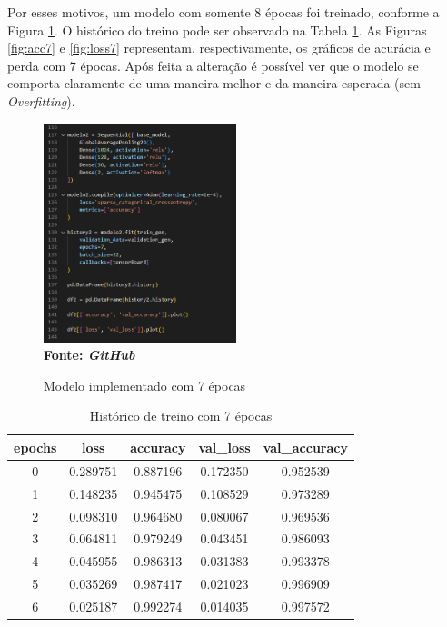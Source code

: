 Por esses motivos, um modelo com somente 8 épocas foi treinado, conforme a Figura \ref{fig:model7}. O histórico do treino pode ser observado na Tabela \ref{tab:history7}. As Figuras \ref{fig:acc7} e \ref{fig:loss7} representam, respectivamente, os gráficos de acurácia e perda com 7 épocas. Após feita a alteração é possível ver que o modelo se comporta claramente de uma maneira melhor e da maneira esperada (sem \textit{Overfitting}).

\begin{figure}[ht]
 	\centering	
 	\caption[\hspace{0.1cm}Grade Computacional.]{Modelo implementado com 7 épocas}
 	\vspace{-0.4cm}
 	\includegraphics[width=0.5\textwidth]{figuras/model_7.png}
 	\captionsetup{justification=centering}
	\vspace{-0.2cm}
     \\\textbf{\footnotesize Fonte: \textit{GitHub}}
	\label{fig:model7}
\end{figure}

\begin{table}[h]
  \centering
  \caption{Histórico de treino com 7 épocas}
   \label{tab:history7}
\begin{tabular}{|c|c|c|c|c|} 
  \hline
   epochs & loss & accuracy & val\_loss & val\_accuracy \\
  \hline
0 & 0.289751 & 0.887196 & 0.172350 & 0.952539 \\
1 & 0.148235 & 0.945475 & 0.108529 & 0.973289 \\
2 & 0.098310 & 0.964680 & 0.080067 & 0.969536 \\
3 & 0.064811 & 0.979249 & 0.043451 & 0.986093 \\
4 & 0.045955 & 0.986313 & 0.031383 & 0.993378 \\
5 & 0.035269 & 0.987417 & 0.021023 & 0.996909 \\
6 & 0.025187 & 0.992274 & 0.014035 & 0.997572 \\
  \hline
\end{tabular}

\end{table}

